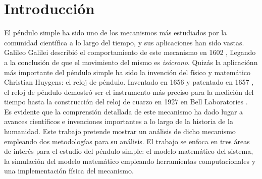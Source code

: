 \section{Introducción}

El péndulo simple ha sido uno de los mecanismos más estudiados 
por la comunidad científica a lo largo del tiempo, 
y sus aplicaciones han sido vastas. 
Galileo Galilei describió el comportamiento de
este mecanismo en 1602 \cite{drake2003galileo}, 
llegando a la conclusión de que el movimiento del mismo es 
\emph{isócrono}.
Quizás la aplicaciónn más importante del péndulo simple ha sido
la invención del físico y matemático Christian Huygens: el reloj
de péndulo.
Inventado en 1656 y patentado en 1657 \cite{bennet2002huygenclock}, 
el reloj de péndulo demostró ser el instrumento más preciso para
la medición del tiempo hasta la construcción del reloj de
cuarzo en 1927 en Bell Laboratories \cite{morrison1948quartzcrystalclock}.\\

Es evidente que la comprensión detallada de este mecanismo
ha dado lugar a avances científicos e invenciones importantes 
a lo largo de la historia de la humanidad.
Este trabajo pretende mostrar un análisis de dicho mecanismo
empleando dos metodologías para su análisis.
El trabajo se enfoca en tres áreas de interés para el estudio
del péndulo simple: el modelo matemático del sistema, 
la simulación del modelo matemático empleando 
herramientas computacionales y una implementación
física del mecanismo.
